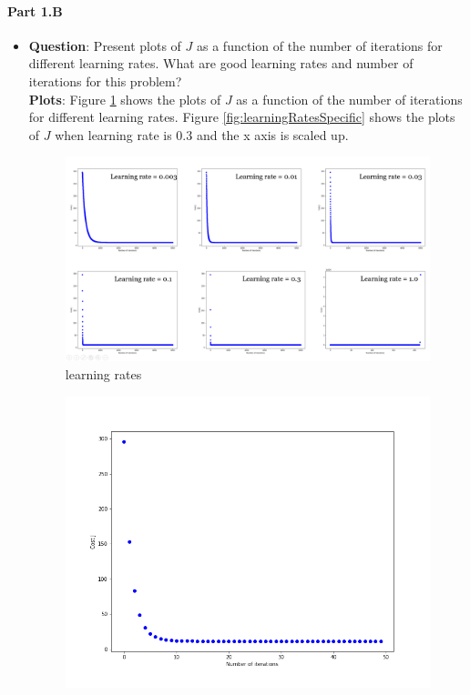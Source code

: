 \documentclass[paper=a4, fontsize=11pt]{scrartcl} %
\numberwithin{equation}{section} %
\numberwithin{figure}{section} %
\numberwithin{table}{section} %
\begin{document}
\paragraph{\textbf{Part 1.B}}
\begin{itemize}
	\item
        \textbf{Question}: Present plots of $J$ as a function of the number of iterations for different learning rates. What are good learning rates and number of iterations for this problem?
        \\ \textbf{Plots}:
            Figure \ref{fig:learningRates} shows the plots of $J$ as a function of the number of iterations for different learning rates. Figure \ref{fig:learningRatesSpecific} shows the plots of $J$ when learning rate is 0.3 and the x axis is scaled up.
            \begin{figure}
         		\centering
         		\includegraphics[scale=0.3]{Comparation.png}
         		\caption{learning rates}
         		\label{fig:learningRates}
         	\end{figure}
            \begin{figure}
         		\centering
         		\includegraphics[scale=0.3]{learningRateSpec.png}

\end{figure}
\end{itemize}
\end{document}
